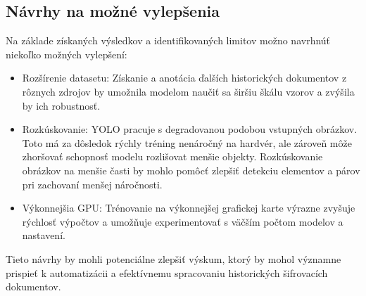     \subsection{Návrhy na možné vylepšenia}
    Na základe získaných výsledkov a identifikovaných limitov možno navrhnúť niekoľko možných vylepšení: 
    \begin{itemize}
        \item Rozšírenie datasetu: Získanie a anotácia ďalších historických dokumentov z rôznych zdrojov by umožnila modelom naučiť sa širšiu škálu vzorov a zvýšila by ich robustnosť. 
        
        \item Rozkúskovanie: YOLO pracuje s degradovanou podobou vstupných obrázkov. Toto má za dôsledok rýchly tréning nenáročný na hardvér, ale zároveň môže zhoršovať schopnosť modelu rozlišovat menšie objekty. Rozkúskovanie obrázkov na menšie časti by mohlo pomôcť zlepšiť detekciu elementov a párov pri zachovaní menšej náročnosti.
        
        \item Výkonnejšia GPU: Trénovanie na výkonnejšej grafickej karte výrazne zvyšuje rýchlosť výpočtov a umožňuje experimentovať s väčším počtom modelov a nastavení.
    
    \end{itemize}
    Tieto návrhy by mohli potenciálne zlepšiť výskum, ktorý by mohol významne prispieť k automatizácii a efektívnemu spracovaniu historických šifrovacích dokumentov.


%
%

